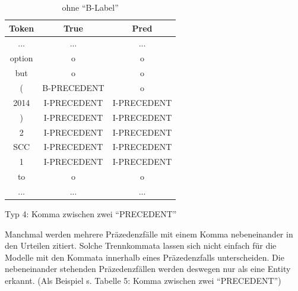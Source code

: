 \documentclass[paper=A4, ngerman, fontsize=12pt]{article}
\begin{document}
\begin{table}
	\begin{center}
		\begin{tabular}{@{}| c | c c | @{}}
			\toprule
			Token & True& Pred   \\ \midrule
			\hline
			... & ... & ... \\ \midrule
			option & o & o \\ \midrule
			but & o & o \\ \midrule
			( & B-PRECEDENT & o \\   \midrule
			2014 & I-PRECEDENT & I-PRECEDENT \\   \midrule
			) & I-PRECEDENT & I-PRECEDENT  \\  \midrule
			2 &  I-PRECEDENT & I-PRECEDENT \\ \midrule
			SCC &  I-PRECEDENT& I-PRECEDENT \\   \midrule
			1 & I-PRECEDENT & I-PRECEDENT \\  \midrule
			to &  o & o \\   \midrule
			... & ... & ... \\  \bottomrule
		\end{tabular}
		\caption{ohne \enquote{B-Label}}
	\end{center}
\end{table}	

	\medskip
	\indent
	Typ 4: Komma zwischen zwei \enquote{PRECEDENT}
	
	\indent
	Manchmal werden mehrere Präzedenzfälle mit einem Komma nebeneinander in den Urteilen zitiert. Solche Trennkommata lassen sich nicht einfach für die Modelle mit den Kommata innerhalb eines Präzedenzfalls unterscheiden. Die nebeneinander stehenden Präzedenzfällen werden deswegen nur als eine Entity erkannt. (Als Beispiel s. Tabelle 5: Komma zwischen zwei \enquote{PRECEDENT})
\end{document}
